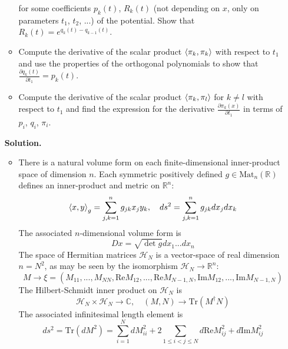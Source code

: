 \documentclass[12pt]{article}
\theoremstyle{definition}
\begin{document}
\begin{enumerate}
\begin{itemize}
        for some coefficients $p_k(t)$, $R_k(t)$ (not depending on $x$, only on parameters $t_1$, $t_2$, ...) of the potential. Show that $R_k(t)=e^{q_k(t)-q_{k-1}(t)}$.
        \item Compute the derivative of the scalar product $\braket{\pi_k,\pi_k}$ with respect to $t_1$ and use the properties of the orthogonal polynomials to show that $\frac{\partial q_k(t)}{\partial t_1}=p_k(t)$.
        \item Compute the derivative of the scalar product $\braket{\pi_k,\pi_l}$ for $k\neq l$ with respect to $t_1$ and find the expression for the derivative $\frac{\partial\pi_k(x)}{\partial t_1}$ in terms of $p_i$, $q_i$, $\pi_i$.
    \end{itemize}
    \textbf{Solution.}
    \begin{itemize}
        \item There is a natural volume form on each finite-dimensional inner-product space of dimension $n$. Each symmetric positively defined $g\in\text{Mat}_n(\mathbb{R})$ defines an inner-product and metric on $\mathbb{R}^n$:
        \begin{equation}
            \braket{x,y}_g=\sum\limits_{j,k=1}^ng_{jk}x_jy_k,\quad ds^2=\sum\limits_{j,k=1}^ng_{jk}dx_jdx_k
        \end{equation}
        The associated $n$-dimensional volume form is
        \begin{equation}
            Dx=\sqrt{\det g}dx_1...dx_n
        \end{equation}
        The space of Hermitian matrices $\mathcal{H}_N$ is a vector-space of real dimension $n=N^2$, as may be seen by the isomorphism $\mathcal{H}_N\rightarrow\mathbb{R}^n$:
        \begin{equation}
            M\rightarrow\xi=(M_{11},...,M_{NN},\text{Re}M_{12},...,\text{Re}M_{N-1,N},\text{Im}M_{12},...,\text{Im}M_{N-1,N})
        \end{equation}
        The Hilbert-Schmidt inner product on $\mathcal{H}_N$ is
        \begin{equation}
            \mathcal{H}_N\times\mathcal{H}_N\rightarrow\mathbb{C},\quad(M,N)\rightarrow\text{Tr}(M^\dagger N)
        \end{equation}
        The associated infinitesimal length element is
        \begin{equation}\label{eq7}
            ds^2=\text{Tr}(dM^2)=\sum\limits_{i=1}^NdM_{ii}^2+2\sum\limits_{1\leq i<j\leq N}d\text{Re}M_{ij}^2+d\text{Im}M_{ij}^2
        \end{equation}

\end{itemize}
\end{enumerate}
\end{document}
